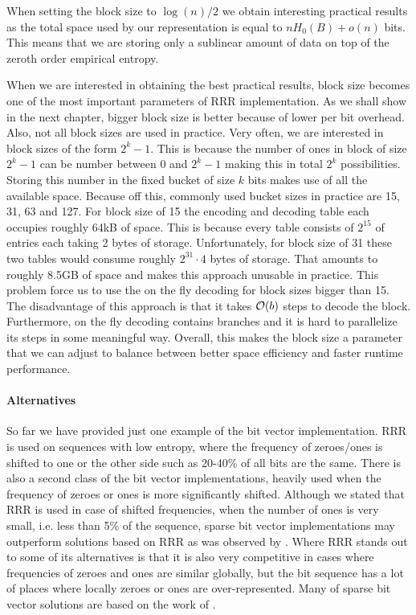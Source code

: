 When setting the block size to $\log(n)/2$ we obtain interesting practical results as
the total space used by our representation is equal to $nH_0(B) + o(n)$ bits. This means
that we are storing only a sublinear amount of data on top of the zeroth order empirical entropy.

When we are interested in obtaining the best practical results, block size becomes
one of the most important parameters of RRR implementation. As we shall show in the next
chapter, bigger block size is better because of lower per bit overhead. Also, not all block
sizes are used in practice. Very often, we are interested in block sizes of the form $2^k-1$.
This is because the number of ones in block of size $2^k-1$ can be number between 0 and $2^k-1$
making this in total $2^k$ possibilities. Storing this number in the fixed bucket of size
$k$ bits makes use of all the available space. Because off this, commonly used bucket sizes in
practice are 15, 31, 63 and 127. For block size of 15 the encoding and decoding table
each occupies roughly 64kB of space. This is because every table consists of $2^{15}$ of entries
each taking 2 bytes of storage. Unfortunately, for block size of 31 these two tables would consume
roughly $2^{31}\cdot 4$ bytes of storage. That amounts to roughly 8.5GB of space and makes this approach
unusable in practice. This problem force us to use the on the fly decoding for block sizes
bigger than 15. The disadvantage of this approach is that it takes $\mathcal{O}(b)$ steps to decode the block.
Furthermore, on the fly decoding contains branches and it is hard to parallelize its steps in some meaningful
way. Overall, this makes the block size a parameter that we can adjust to balance between better space
efficiency and faster runtime performance.

\paragraph{Alternatives}

So far we have provided just one example of the bit vector implementation.
RRR is used on sequences with low entropy, where the frequency of zeroes/ones
is shifted to one or the other side such as 20-40\% of all bits are the same.
There is also a second class of the bit vector implementations, heavily
used when the frequency of zeroes or ones is more significantly shifted.
Although we stated that RRR is used in case of shifted frequencies, when the number
of ones is very small, i.e. less than 5\% of the sequence, sparse bit vector
implementations may outperform solutions based on RRR as was observed by \cite{navarro2012fast}.
Where RRR stands out to some of its alternatives is that it is also very competitive
in cases where frequencies of zeroes and ones are similar globally, but the bit
sequence has a lot of places where locally zeroes or ones are over-represented.
Many of sparse bit vector solutions are based on the work of \cite{okanohara2007practical}.